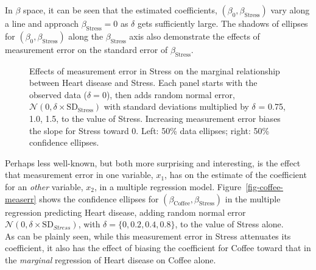 \documentclass[
  letterpaper,
  10pt,
  krantz2]{krantz}
\begin{document}
{In \(\beta\) space, it can be seen that the estimated coefficients,
\((\beta_0, \beta_{\textrm{Stress}})\) vary along a line and approach
\(\beta_{\textrm{Stress}}=0\) as \(\delta\) gets sufficiently large. The
shadows of ellipses for \((\beta_0, \beta_{\textrm{Stress}})\) along the
\(\beta_{\textrm{Stress}}\) axis also demonstrate the effects of
measurement error on the standard error of \(\beta_{\textrm{Stress}}\).

\begin{figure}


\caption{\label{fig-coffee-measerr-data-beta}Effects of measurement
error in Stress on the marginal relationship between Heart disease and
Stress. Each panel starts with the observed data (\(\delta = 0\)), then
adds random normal error,
\(\mathcal{N}(0, \delta \times \text{SD}_\text{Stress})\) with standard
deviations multiplied by \(\delta\) = 0.75, 1.0, 1.5, to the value of
Stress. Increasing measurement error biases the slope for Stress toward
0. Left: 50\% data ellipses; right: 50\% confidence ellipses.}

\end{figure}%

Perhaps less well-known, but both more surprising and interesting, is
the effect that measurement error in one variable, \(x_1\), has on the
estimate of the coefficient for an \emph{other} variable, \(x_2\), in a
multiple regression model. Figure~\ref{fig-coffee-measerr} shows the
confidence ellipses for
\((\beta_{\textrm{Coffee}}, \beta_{\textrm{Stress}})\) in the multiple
regression predicting Heart disease, adding random normal error
\(\mathcal{N}(0, \delta \times \mathrm{SD}_{Stress})\), with
\(\delta = \{0, 0.2, 0.4, 0.8\}\), to the value of Stress alone.\\
As can be plainly seen, while this measurement error in Stress
attenuates its coefficient, it also has the effect of biasing the
coefficient for Coffee toward that in the \emph{marginal} regression of
Heart disease on Coffee alone.

}
\end{document}
